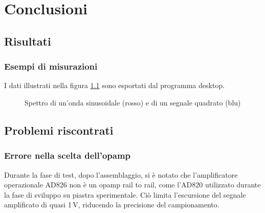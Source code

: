 \chapter{Conclusioni}
\section{Risultati}

\subsection{Esempi di misurazioni}
I dati illustrati nella figura \ref{fig:measurements} sono esportati dal
programma desktop.
\begin{figure}[H] \centering
    \caption{
        Spettro di un'onda sinusoidale (rosso) e di un segnale quadrato (blu)
        \label{fig:measurements}
    }
\end{figure}

\section{Problemi riscontrati}
\subsection{Errore nella scelta dell'opamp}
\label{sec:err-opamp}

Durante la fase di test, dopo l'assemblaggio, si \`e notato che
l'amplificatore operazionale AD826 non \`e un opamp rail to rail, come l'AD820
utilizzato durante la fase di sviluppo su piastra sperimentale.  Ci\`o limita
l'escursione del segnale amplificato di quasi 1\,V, riducendo la precisione
del campionamento.

